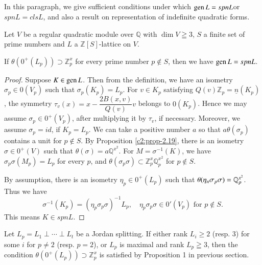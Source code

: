\subsection{}\label{c2:subsec2.4.3} 
In this paragraph, we give sufficient
conditions under which 
$\operatorname{gen} L=spn L$\pageoriginale or $spn L = cls L$, and also a result on
representation 
of indefinite quadratic forms.

\begin{theorem}\label{c2:thm-2.34}
Let $V$ be a regular quadratic module over $\mathbb{Q}$ with $\dim
V \geqq 3$, $S$ a finite set of prime numbers and $L$ a
$\mathbb{Z}[S]$-lattice on $V$.

If $\theta (0^+(L_p)) \supset \mathbb{Z}^x_p$ for every prime number
$p\not\in S$, then we have $\operatorname{gen} L=spn L$. 
\end{theorem}

\begin{proof}
Suppose $K\in \operatorname{gen} L$. Then from the definition, we have an isometry
$\sigma_p \in 0(V_p)$ such that $\sigma_p(K_p)=L_p$. For
$v\in K_p$ satisfying $Q(v)\mathbb{Z}_p=\underline{n}(K_p)$,
the symmetry $\tau_v(x)=x-\dfrac{2B(x,v)}{Q(v)}v$ belongs to
$0(K_p)$. Hence we may assume $\sigma_p\in 0^+(V_p)$, after
multiplying it by $\tau_v$, if necessary. Moreover, we assume
$\sigma_p=id$, if $K_p=L_p$. We can take a positive number $a$ so that
$a \theta (\sigma_p)$ contains a unit for $p\not\in S$. By Proposition
\ref{c2:prop-2.19}, there is an isometry $\sigma \in 0^+(V)$ such that
$\theta(\sigma)=a\mathbb{Q}^{x^2}$. For $M=\sigma^{-1}(K)$, we have
$\sigma_p\sigma(M_p) = L_p$ for every $p$, and $\theta(\sigma_p\sigma)
\subset \mathbb{Z}^x_p \mathbb{Q}^{x^2}_p$ for $p\not\in S$.

By assumption, there is an isometry $\eta_p \in 0^+(L_p)$ such
that $\theta(\eta_n \sigma_p\break \sigma)=\mathbb{Q}^{x^2}_p$. Thus we have 
$$
\sigma^{-1}(K_p) = (\eta_p \sigma_p \sigma)^{-1}
L_p, \quad \eta_p \sigma_p \sigma  \in 0'(V_p) \text{ for }
p \not\in S.
$$
This means $K \in spn L$.
\end{proof}

\begin{remark*}
Let $L_p = L_1 \perp \cdots \perp L_t$ be a Jordan splitting. If
either rank $L_i \geq 2$ (resp. 3) for some $i$ for $p\neq 2$
(resp. $p=2$), or $L_p$ is maximal and rank $L_p \geqq 3$, then the
condition $\theta (0^+(L_p)) \supset \mathbb{Z}^x_p$ is satisfied by
Proposition 1 in previous section. 
\end{remark*}

